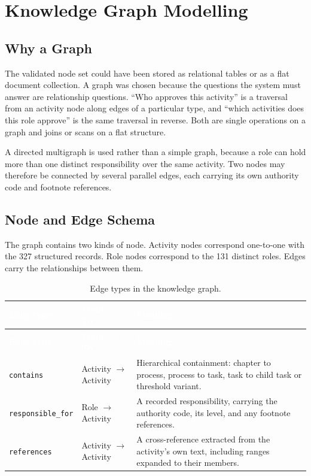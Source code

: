 \section{Knowledge Graph Modelling}

\subsection{Why a Graph}

The validated node set could have been stored as relational tables or as a flat document collection. A graph was chosen because the questions the system must answer are relationship questions. ``Who approves this activity'' is a traversal from an activity node along edges of a particular type, and ``which activities does this role approve'' is the same traversal in reverse. Both are single operations on a graph and joins or scans on a flat structure.

A directed multigraph is used rather than a simple graph, because a role can hold more than one distinct responsibility over the same activity. Two nodes may therefore be connected by several parallel edges, each carrying its own authority code and footnote references.

\subsection{Node and Edge Schema}

The graph contains two kinds of node. Activity nodes correspond one-to-one with the 327 structured records. Role nodes correspond to the 131 distinct roles. Edges carry the relationships between them.

\begin{longtable}{|p{}|p{}|p{}|}
\caption{Edge types in the knowledge graph.}\label{tab:edges}\\
\hline
\rowcolor{thesisgreen}\textcolor{white}{\textbf{Edge type}} & \textcolor{white}{\textbf{From $\rightarrow$ To}} & \textcolor{white}{\textbf{Meaning}} \\
\hline
\endfirsthead
\hline
\rowcolor{thesisgreen}\textcolor{white}{\textbf{Edge type}} & \textcolor{white}{\textbf{From $\rightarrow$ To}} & \textcolor{white}{\textbf{Meaning}} \\
\hline
\endhead
\texttt{contains} & Activity $\rightarrow$ Activity & Hierarchical containment: chapter to process, process to task, task to child task or threshold variant. \\ \hline
\texttt{responsible\_for} & Role $\rightarrow$ Activity & A recorded responsibility, carrying the authority code, its level, and any footnote references. \\ \hline
\texttt{references} & Activity $\rightarrow$ Activity & A cross-reference extracted from the activity's own text, including ranges expanded to their members. \\ \hline
\end{longtable}


